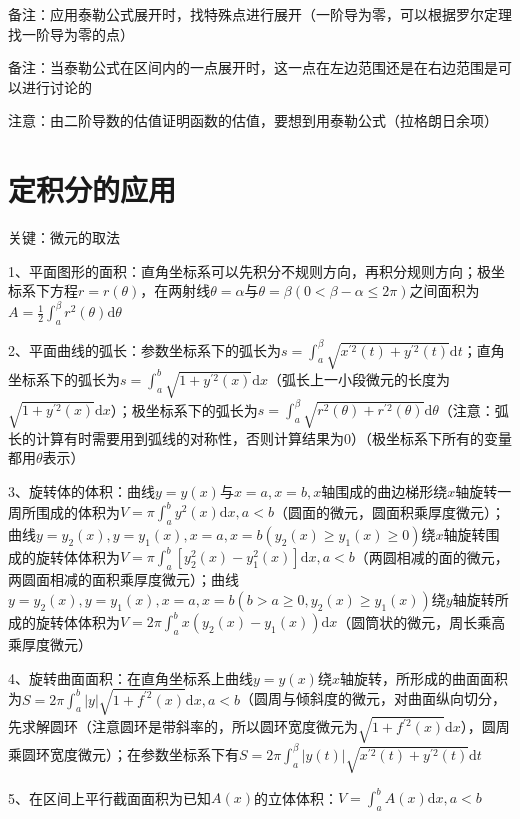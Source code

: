 备注：应用泰勒公式展开时，找特殊点进行展开（一阶导为零，可以根据罗尔定理找一阶导为零的点）

备注：当泰勒公式在区间内的一点展开时，这一点在左边范围还是在右边范围是可以进行讨论的

注意：由二阶导数的估值证明函数的估值，要想到用泰勒公式（拉格朗日余项）

\section{定积分的应用}

关键：微元的取法

1、平面图形的面积：直角坐标系可以先积分不规则方向，再积分规则方向；极坐标系下方程$r=r(\theta)$，在两射线$\theta=\alpha$与$\theta=\beta(0<\beta-\alpha \leqslant 2 \pi)$之间面积为$A=\frac{1}{2} \int_{a}^{\beta} r^{2}(\theta) \mathrm{d} \theta$

2、平面曲线的弧长：参数坐标系下的弧长为$s=\int_{a}^{\beta} \sqrt{x^{\prime 2}(t)+y^{\prime 2}(t)} \mathrm{d} t$；直角坐标系下的弧长为$s=\int_{a}^{b} \sqrt{1+y^{\prime 2}(x)} \mathrm{d} x$（弧长上一小段微元的长度为$\sqrt{1+y^{\prime 2}(x)} \mathrm{d} x$）；极坐标系下的弧长为$s=\int_{a}^{\beta} \sqrt{r^{2}(\theta)+r^{\prime 2}(\theta)} \mathrm{d} \theta$（注意：弧长的计算有时需要用到弧线的对称性，否则计算结果为0）（极坐标系下所有的变量都用$\theta$表示）

3、旋转体的体积：曲线$y=y(x)$与$x=a, x=b, x$轴围成的曲边梯形绕$x$轴旋转一周所围成的体积为$V=\pi \int_{a}^{b} y^{2}(x) \mathrm{d} x, a<b$（圆面的微元，圆面积乘厚度微元）；曲线$y=y_{2}(x), y=y_{1}(x), x=a, x=b\left(y_{2}(x) \geqslant y_{1}(x) \geqslant 0\right)$绕$x$轴旋转围成的旋转体体积为$V=\pi \int_{a}^{b}\left[y_{2}^{2}(x)-y_{1}^{2}(x)\right] \mathrm{d} x, a<b$（两圆相减的面的微元，两圆面相减的面积乘厚度微元）；曲线$y=y_{2}(x), y=y_{1}(x), x=a, x=b\left(b>a \geqslant 0, y_{2}(x) \geqslant y_{1}(x)\right)$绕$y$轴旋转所成的旋转体体积为$V=2 \pi \int_{a}^{b} x\left(y_{2}(x)-y_{1}(x)\right) \mathrm{d} x$（圆筒状的微元，周长乘高乘厚度微元）

4、旋转曲面面积：在直角坐标系上曲线$y=y(x)$绕$x$轴旋转，所形成的曲面面积为$S=2 \pi \int_{a}^{b}|y| \sqrt{1+f^{\prime 2}(x)} \mathrm{d} x, a<b$（圆周与倾斜度的微元，对曲面纵向切分，先求解圆环（注意圆环是带斜率的，所以圆环宽度微元为$\sqrt{1+f^{\prime 2}(x)} \mathrm{d} x$），圆周乘圆环宽度微元）；在参数坐标系下有$S=2 \pi \int_{a}^{\beta}|y(t)| \sqrt{x^{\prime 2}(t)+y^{\prime 2}(t)} \mathrm{d} t$

5、在区间上平行截面面积为已知$A(x)$的立体体积：$V=\int_{a}^{b} A(x) \mathrm{d} x, a<b$

